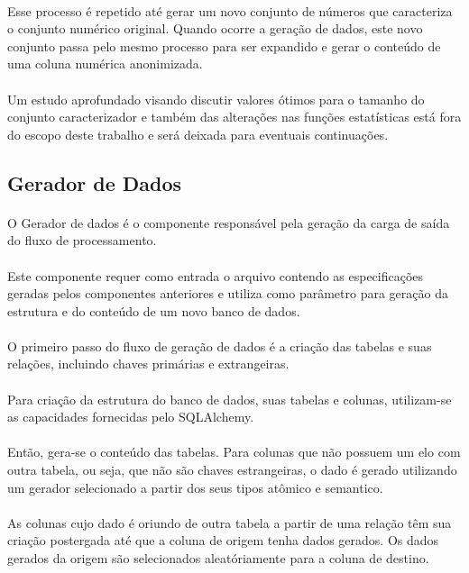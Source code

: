 \paragraph{} Esse processo é repetido até gerar um novo conjunto de números que caracteriza o conjunto numérico original. Quando ocorre a geração de dados, este novo conjunto passa pelo mesmo processo para ser expandido e gerar o conteúdo de uma coluna numérica anonimizada.

\paragraph{} Um estudo aprofundado visando discutir valores ótimos para o tamanho do conjunto caracterizador e também das alterações nas funções estatísticas está fora do escopo deste trabalho e será deixada para eventuais continuações.

\subsection{Gerador de Dados}

\paragraph{} O Gerador de dados é o componente responsável pela geração da carga de saída do fluxo de processamento.

\paragraph{} Este componente requer como entrada o arquivo contendo as especificações geradas pelos componentes anteriores e utiliza como parâmetro para geração da estrutura e do conteúdo de um novo banco de dados.

\paragraph{} O primeiro passo do fluxo de geração de dados é a criação das tabelas e suas relações, incluindo chaves primárias e extrangeiras.

\paragraph{} Para criação da estrutura do banco de dados, suas tabelas e colunas, utilizam-se as capacidades fornecidas pelo SQLAlchemy.

\paragraph{} Então, gera-se o conteúdo das tabelas. Para colunas que não possuem um elo com outra tabela, ou seja, que não são chaves estrangeiras, o dado é gerado utilizando um gerador selecionado a partir dos seus tipos atômico e semantico.

\paragraph{} As colunas cujo dado é oriundo de outra tabela a partir de uma relação têm sua criação postergada até que a coluna de origem tenha dados gerados. Os dados gerados da origem são selecionados aleatóriamente para a coluna de destino.